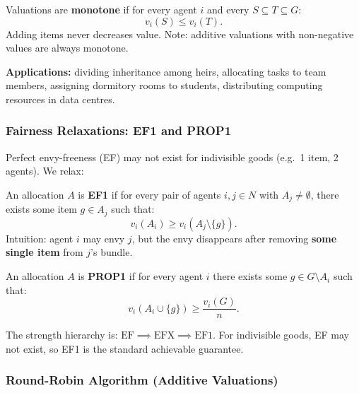 \begin{defbox}
Valuations are \textbf{monotone} if for every agent $i$ and every $S \subseteq T \subseteq G$:
\[
  v_i(S) \leq v_i(T).
\]
Adding items never decreases value. Note: additive valuations with non-negative values are always monotone.
\end{defbox}

\textbf{Applications:} dividing inheritance among heirs, allocating tasks to team members, assigning dormitory rooms to students, distributing computing resources in data centres.

\separator

\subsubsection{Fairness Relaxations: EF1 and PROP1}

Perfect envy-freeness (EF) may not exist for indivisible goods (e.g.\ 1 item, 2 agents). We relax:

\begin{defbox}
An allocation $A$ is \textbf{EF1} if for every pair of agents $i, j \in N$ with $A_j \neq \emptyset$, there exists some item $g \in A_j$ such that:
\[
  v_i(A_i) \geq v_i(A_j \setminus \{g\}).
\]
Intuition: agent $i$ may envy $j$, but the envy disappears after removing \textbf{some single item} from $j$'s bundle.
\end{defbox}

\begin{defbox}
An allocation $A$ is \textbf{PROP1} if for every agent $i$ there exists some $g \in G \setminus A_i$ such that:
\[
  v_i(A_i \cup \{g\}) \geq \frac{v_i(G)}{n}.
\]
\end{defbox}

\begin{tipbox}[EF1 vs EF vs EFX]
The strength hierarchy is: $\text{EF} \implies \text{EFX} \implies \text{EF1}$. For indivisible goods, EF may not exist, so EF1 is the standard achievable guarantee.
\end{tipbox}

\separator

\subsubsection{Round-Robin Algorithm (Additive Valuations)}

